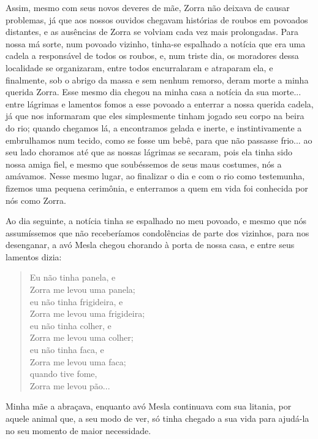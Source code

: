 Assim, mesmo com seus novos deveres de mãe, Zorra não deixava de causar problemas, já que aos nossos ouvidos chegavam histórias de roubos em povoados distantes, e as ausências de Zorra se volviam cada vez mais prolongadas.
Para nossa má sorte, num povoado vizinho, tinha-se espalhado a notícia que era uma cadela a responsável de todos os roubos, e, num triste dia, os moradores dessa localidade se organizaram, entre todos encurralaram e atraparam ela, e finalmente, sob o abrigo da massa e sem nenhum remorso, deram morte a minha querida Zorra.
Esse mesmo dia chegou na minha casa a notícia da sua morte... entre lágrimas e lamentos fomos a esse povoado a enterrar a nossa querida cadela, já que nos informaram que eles simplesmente tinham jogado seu corpo na beira do rio; quando chegamos lá, a encontramos gelada e inerte, e instintivamente a embrulhamos num tecido, como se fosse um bebê, para que não passasse frio... ao seu lado choramos até que as nossas lágrimas se secaram, pois ela tinha sido nossa amiga fiel, e mesmo que soubéssemos de  seus maus costumes, nós a amávamos.
Nesse mesmo lugar, ao finalizar o dia e com o rio como testemunha, fizemos uma pequena cerimônia, e enterramos a quem em vida foi conhecida por nós como Zorra. 

Ao dia seguinte, a notícia tinha se espalhado no meu povoado, e mesmo que nós assumíssemos que não receberíamos condolências de parte dos vizinhos, para nos desenganar, a avó Mesla chegou chorando à porta de nossa casa, e entre seus lamentos dizia:
\begin{quotation}
\noindent Eu não tinha panela, e \\Zorra me levou uma panela;\\ 
eu não tinha frigideira, e \\Zorra me levou uma frigideira;\\ 
eu não tinha colher, e \\Zorra me levou uma colher;\\
eu não tinha faca, e \\Zorra me levou uma faca;\\
quando tive fome, \\Zorra me levou pão...  
\end{quotation}
Minha mãe a abraçava, enquanto avó Mesla continuava com sua litania, por aquele animal que, a seu modo de ver, só tinha chegado a sua vida para ajudá-la no seu momento de maior necessidade.
 

